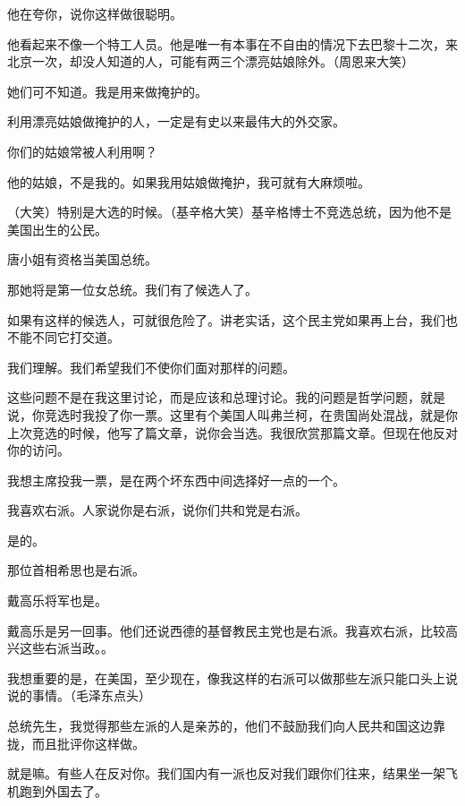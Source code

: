 他在夸你，说你这样做很聪明。

他看起来不像一个特工人员。他是唯一有本事在不自由的情况下去巴黎十二次，来北京一次，却没人知道的人，可能有两三个漂亮姑娘除外。（周恩来大笑）

她们可不知道。我是用来做掩护的。

利用漂亮姑娘做掩护的人，一定是有史以来最伟大的外交家。

你们的姑娘常被人利用啊？

他的姑娘，不是我的。如果我用姑娘做掩护，我可就有大麻烦啦。

（大笑）特别是大选的时候。（基辛格大笑）基辛格博士不竞选总统，因为他不是美国出生的公民。

唐小姐有资格当美国总统。

那她将是第一位女总统。我们有了候选人了。

如果有这样的候选人，可就很危险了。讲老实话，这个民主党如果再上台，我们也不能不同它打交道。

我们理解。我们希望我们不使你们面对那样的问题。

这些问题不是在我这里讨论，而是应该和总理讨论。我的问题是哲学问题，就是说，你竞选时我投了你一票。这里有个美国人叫弗兰柯，在贵国尚处混战，就是你上次竞选的时候，他写了篇文章，说你会当选。我很欣赏那篇文章。但现在他反对你的访问。

我想主席投我一票，是在两个坏东西中间选择好一点的一个。

我喜欢右派。人家说你是右派，说你们共和党是右派。

是的。

那位首相希思也是右派。

戴高乐将军也是。

戴高乐是另一回事。他们还说西德的基督教民主党也是右派。我喜欢右派，比较高兴这些右派当政。。

我想重要的是，在美国，至少现在，像我这样的右派可以做那些左派只能口头上说说的事情。（毛泽东点头）

总统先生，我觉得那些左派的人是亲苏的，他们不鼓励我们向人民共和国这边靠拢，而且批评你这样做。

就是嘛。有些人在反对你。我们国内有一派也反对我们跟你们往来，结果坐一架飞机跑到外国去了。

